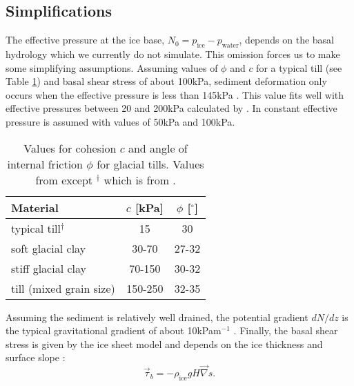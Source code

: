 \subsection{Simplifications}
The effective pressure at the ice base, $N_0=p_{\text{ice}}-p_{\text{water}}$, depends on the basal hydrology which we currently do not simulate. This omission forces us to make some simplifying assumptions. Assuming values of $\phi$ and $c$ for a typical till (see Table \ref{erosion.tab.typical_till}) and basal shear stress of about 100kPa, sediment deformation only occurs when the effective pressure is less than 145kPa \citep{glac.1}. This value fits well with effective pressures between 20 and 200kPa calculated by \citet{erosion.5}. In \citet{erosion.4} constant effective pressure is assumed with values of 50kPa and 100kPa.

\begin{table}[htbp]
  \centering
  \begin{tabular}{|l|c|c|}
    \hline
    Material & $c$ [kPa] & $\phi$ [$^\circ$] \\
    \hline
    typical till$^\dag$ & 15 & 30\\
    soft glacial clay & 30-70 & 27-32\\
    stiff glacial clay & 70-150 & 30-32\\
    till (mixed grain size) & 150-250 & 32-35\\
    \hline
  \end{tabular}
  \caption{Values for cohesion $c$ and angle of internal friction $\phi$ for glacial tills. Values from \citet{glac.5} except $^\dag$ which is from \citet{erosion.14}.}
  \label{erosion.tab.typical_till}
\end{table}

Assuming the sediment is relatively well drained, the potential gradient $dN/dz$ is the typical gravitational gradient of about 10kPam$^{-1}$ \citep{erosion.5}. Finally, the basal shear stress is given by the ice sheet model and depends on the ice thickness and surface slope \citep{glac.1}:
\begin{equation}
  \vec\tau_b=-\rho_{\text{ice}}gH\vec\nabla s.
\end{equation}

